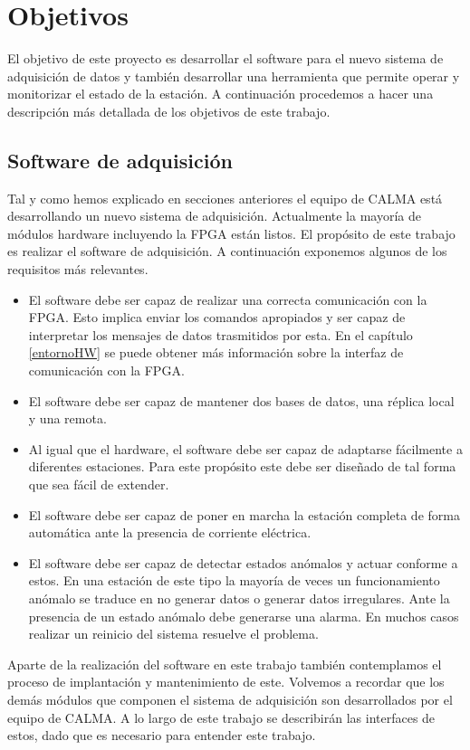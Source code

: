 \section{Objetivos}
	El objetivo de este proyecto es desarrollar el software para el nuevo sistema de adquisición de datos y también desarrollar una herramienta
	que permite operar y monitorizar el estado de la estación. A continuación procedemos a hacer una descripción más detallada de los objetivos de
	este trabajo.  
	\subsection{Software de adquisición}
		Tal y como hemos explicado en secciones anteriores el equipo de CALMA está desarrollando un nuevo sistema de adquisición. Actualmente
		la mayoría de módulos hardware incluyendo la FPGA están listos. El propósito de este trabajo es realizar el software de adquisición. A
		continuación exponemos algunos de los requisitos más relevantes.
		\begin{itemize}
			\item 	El software debe ser capaz de realizar una correcta comunicación con la FPGA. Esto implica enviar los comandos
				apropiados y ser capaz de interpretar los mensajes de datos trasmitidos por esta. En el capítulo \ref{entornoHW} se
				puede obtener más información sobre la interfaz de comunicación con la FPGA.
			\item 	El software debe ser capaz de mantener dos bases de datos, una réplica local y una remota.
			\item 	Al igual que el hardware, el software debe ser capaz de adaptarse fácilmente a diferentes estaciones. Para este
				propósito este debe ser diseñado de tal forma que sea fácil de extender.
			\item 	El software debe ser capaz de poner en marcha la estación completa de forma automática ante la presencia de corriente
			  	eléctrica. 
			\item 	El software debe ser capaz de detectar estados anómalos y actuar conforme a estos. En una estación de este tipo la
				mayoría de veces un funcionamiento anómalo se traduce en no generar datos o generar datos irregulares. Ante la
				presencia de un estado anómalo debe generarse una alarma. En muchos casos realizar un reinicio del sistema resuelve el
				problema.
		\end{itemize}
		Aparte de la realización del software en este trabajo también contemplamos el proceso de implantación y mantenimiento de este.
		Volvemos a recordar que los demás módulos que componen el sistema de adquisición son desarrollados por el equipo de CALMA. A lo largo
		de este trabajo se describirán las interfaces de estos, dado que es necesario para entender este trabajo.
